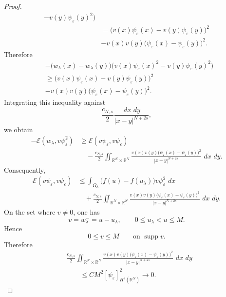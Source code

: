 \documentclass[11pt,a4paper]{article}
\newcommand{\dd}{\,d}
\begin{document}
\begin{proof}
\[\begin{aligned}
-
v(y)\psi_\varepsilon(y)^2
\bigr)\\
&=
\bigl(
v(x)\psi_\varepsilon(x)
-
v(y)\psi_\varepsilon(y)
\bigr)^2\\
&-
v(x)v(y)
\bigl(
\psi_\varepsilon(x)-\psi_\varepsilon(y)
\bigr)^2.
\end{aligned}
\]
Therefore
\[
\begin{aligned}
&-\bigl(w_\lambda(x)-w_\lambda(y)\bigr)
\bigl(
v(x)\psi_\varepsilon(x)^2
-
v(y)\psi_\varepsilon(y)^2
\bigr)\\
&\ge
\bigl(
v(x)\psi_\varepsilon(x)
-
v(y)\psi_\varepsilon(y)
\bigr)^2\\
&-
v(x)v(y)
\bigl(
\psi_\varepsilon(x)-\psi_\varepsilon(y)
\bigr)^2 .
\end{aligned}
\]
Integrating this inequality against
\[
\frac{c_{N,s}}2
\frac{\dd x\,\dd y}{|x-y|^{N+2s}},
\]
we obtain
\begin{equation*}
\begin{aligned}
-\mathcal E(w_\lambda,v\psi_\varepsilon^2)
&\ge
\mathcal E(v\psi_\varepsilon,v\psi_\varepsilon)\\
&\quad -
\frac{c_{N,s}}2
\iint_{\mathbb R^N\times\mathbb R^N}
\frac{
v(x)v(y)
\bigl(
\psi_\varepsilon(x)-\psi_\varepsilon(y)
\bigr)^2
}
{|x-y|^{N+2s}}
\,\dd x\,\dd y .
\end{aligned}
\end{equation*}
Consequently,
\begin{equation}\label{eq:errore}
\begin{aligned}
\mathcal E(v\psi_\varepsilon,v\psi_\varepsilon)
&\le
\int_{\Omega_\lambda}
\bigl(f(u)-f(u_\lambda)\bigr)
v\psi_\varepsilon^2\,\dd x\\
&\quad+
\frac{c_{N,s}}2
\iint_{\mathbb R^N\times\mathbb R^N}
\frac{
v(x)v(y)
\bigl(
\psi_\varepsilon(x)-\psi_\varepsilon(y)
\bigr)^2
}
{|x-y|^{N+2s}}
\,\dd x\,\dd y.
\end{aligned}
\end{equation}
On the set where \(v\neq0\), one has
\[
v=w_\lambda^-=u-u_\lambda,
\qquad
0\le u_\lambda<u\le M.
\]
Hence
\[
0\le v\le M
\qquad\text{on }\operatorname{supp}v.
\]
Therefore
\begin{equation}\label{eq:errore a zero}
\begin{aligned}
&\frac{c_{N,s}}2
\iint_{\mathbb R^N\times\mathbb R^N}
\frac{
v(x)v(y)
\bigl(
\psi_\varepsilon(x)-\psi_\varepsilon(y)
\bigr)^2
}
{|x-y|^{N+2s}}
\,\dd x\,\dd y\\
&\qquad\le
C M^2
[\psi_\varepsilon]_{H^s(\mathbb R^N)}^2
\longrightarrow0.
\end{aligned}

\end{equation}
\end{proof}
\end{document}
